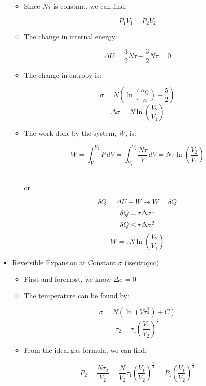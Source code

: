 \begin{itemize}
\begin{itemize}
      \item Since $N\tau$ is constant, we can find:

        $$P_1V_1=P_2V_2$$

      \item The change in internal energy:

        $$\Delta U=\frac{3}{2}N\tau-\frac{3}{2}N\tau=0$$

      \item The change in entropy is:

        $$\sigma=N\left( \ln\left( \frac{n_Q}{n} \right)+\frac{5}{2} \right)$$
        $$\Delta \sigma=N\ln\left( \frac{V_2}{V_1} \right)$$

      \item The work done by the system, $W$, is:

        $$W=\int_{V_1}^{V_2}P\,dV=\int_{V_1}^{V_2}\frac{N\tau}{V}\,dV=N\tau\ln\left( \frac{V_2}{V_1} \right)$$\\

        \begin{center}
        or
        \end{center}

        $$\delta Q=\Delta U+W\rightarrow W=\delta Q$$
        $$\delta Q=\tau\Delta \sigma\footnote{in a reversible process}$$
        $$\delta Q\leq\tau\Delta \sigma\footnote{in general}$$
        $$W=\tau N\ln\left( \frac{V_2}{V_1} \right)$$

    \end{itemize}

  \item Reversible Expansion at Constant $\sigma$ (isentropic)

    \begin{itemize}

      \item First and foremost, we know $\Delta \sigma=0$

      \item The temperature can be found by:

        $$\sigma=N\left( \ln\left( V\tau^{\frac{3}{2}} \right) +C\right)$$
        $$\tau_2=\tau_1\left( \frac{V_1}{V_2} \right)^{\frac{2}{3}}$$

      \item From the ideal gas formula, we can find:

        $$P_2=\frac{N\tau_2}{V_2}=\frac{N}{V_2}\tau_1\left( \frac{V_1}{V_2} \right)^{\frac{2}{3}}=P_1\left( \frac{V_1}{V_2} \right)^{\frac{5}{3}}$$


\end{itemize}
\end{itemize}
